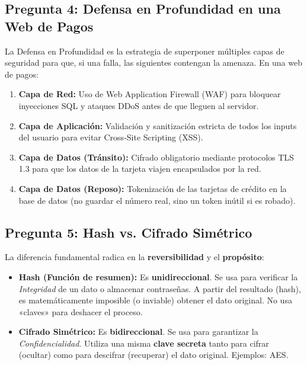\documentclass[11pt,a4paper]{article}
\begin{document}
\subsection*{Pregunta 4: Defensa en Profundidad en una Web de Pagos}
\begin{respuesta}
La Defensa en Profundidad es la estrategia de superponer múltiples capas de seguridad para que, si una falla, las siguientes contengan la amenaza. En una web de pagos:
\begin{enumerate}[leftmargin=*]
  \item \textbf{Capa de Red:} Uso de Web Application Firewall (WAF) para bloquear inyecciones SQL y ataques DDoS antes de que lleguen al servidor.
  \item \textbf{Capa de Aplicación:} Validación y sanitización estricta de todos los inputs del usuario para evitar Cross-Site Scripting (XSS).
  \item \textbf{Capa de Datos (Tránsito):} Cifrado obligatorio mediante protocolos TLS 1.3 para que los datos de la tarjeta viajen encapsulados por la red.
  \item \textbf{Capa de Datos (Reposo):} Tokenización de las tarjetas de crédito en la base de datos (no guardar el número real, sino un token inútil si es robado).
\end{enumerate}
\end{respuesta}

\subsection*{Pregunta 5: Hash vs. Cifrado Simétrico}
\begin{respuesta}
La diferencia fundamental radica en la \textbf{reversibilidad} y el \textbf{propósito}:
\begin{itemize}[leftmargin=*]
  \item \textbf{Hash (Función de resumen):} Es \textbf{unidireccional}. Se usa para verificar la \textit{Integridad} de un dato o almacenar contraseñas. A partir del resultado (hash), es matemáticamente imposible (o inviable) obtener el dato original. No usa «claves» para deshacer el proceso.
  \item \textbf{Cifrado Simétrico:} Es \textbf{bidireccional}. Se usa para garantizar la \textit{Confidencialidad}. Utiliza una misma \textbf{clave secreta} tanto para cifrar (ocultar) como para descifrar (recuperar) el dato original. Ejemplos: AES.
\end{itemize}
\end{respuesta}
\end{document}
